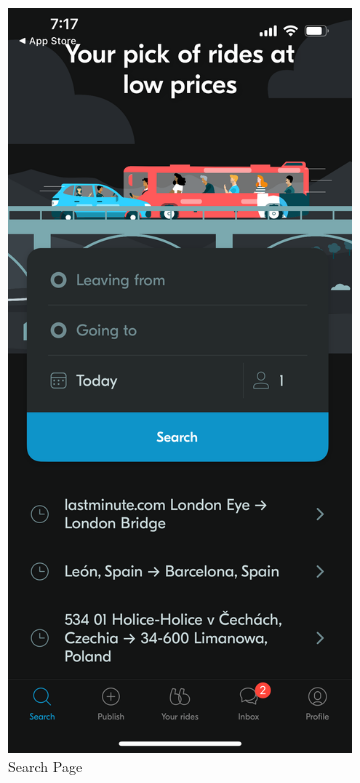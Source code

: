 \documentclass[a4paper, 12pt]{report} %
\begin{document}
                \begin{figure}
                    \centering
                    \begin{subfigure}{0.3\textwidth}
                        \includegraphics[width=0.8\linewidth, height=0.9\textheight, keepaspectratio]{Images/Blablacar_search.PNG}
                        \caption{Search Page}
                        \label{fig:blabla_search}
                    \end{subfigure}
                    \begin{subfigure}{0.3\textwidth}

\end{subfigure}
\end{figure}
\end{document}

